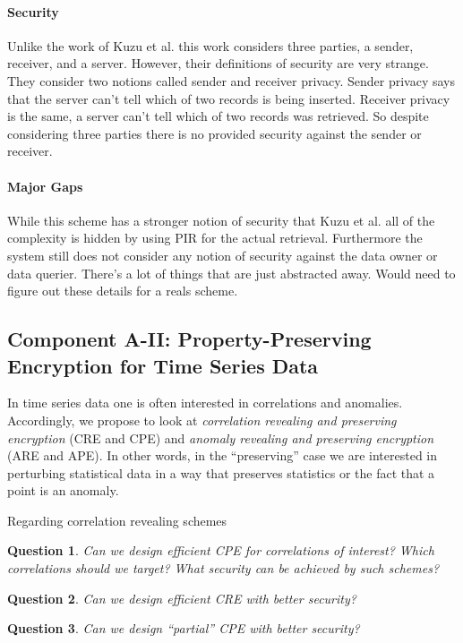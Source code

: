 \documentclass[11pt]{article}
\newtheorem{question}{Question}[section]
\theoremstyle{remark}
\begin{document}
\paragraph{Security} Unlike the work of Kuzu et al. this work considers three parties, a sender, receiver, and a server.  However, their definitions of security are very strange.  They consider two notions called sender and receiver privacy.  Sender privacy says that the server can't tell which of two records is being inserted.  Receiver privacy is the same, a server can't tell which of two records was retrieved.  So despite considering three parties there is no provided security against the sender or receiver.

\paragraph{Major Gaps}  While this scheme has a stronger notion of security that Kuzu et al. all of the complexity is hidden by using PIR for the actual retrieval.  Furthermore the system still does not consider any notion of security against the data owner or data querier.  There's a lot of things that are just abstracted away.  Would need to figure out these details for a reals scheme.

\subsection{Component A-II:  Property-Preserving Encryption for Time Series Data} 

In time series data one is often interested in correlations and anomalies.  Accordingly, we propose to look at \emph{correlation revealing and preserving encryption}  (CRE and CPE) and \emph{anomaly revealing and preserving encryption} (ARE and APE).  In other words, in the ``preserving'' case we are interested in perturbing statistical data in a way that preserves statistics or the fact that a point is an anomaly.  

Regarding correlation revealing schemes
\begin{question}
Can we design efficient CPE for correlations of interest?  Which correlations should we target?  What security can be achieved by such schemes?
\end{question}


\begin{question}
Can we design efficient CRE with better security?
\end{question}

\begin{question}
Can we design ``partial'' CPE with better security?
\end{question}
\end{document}

